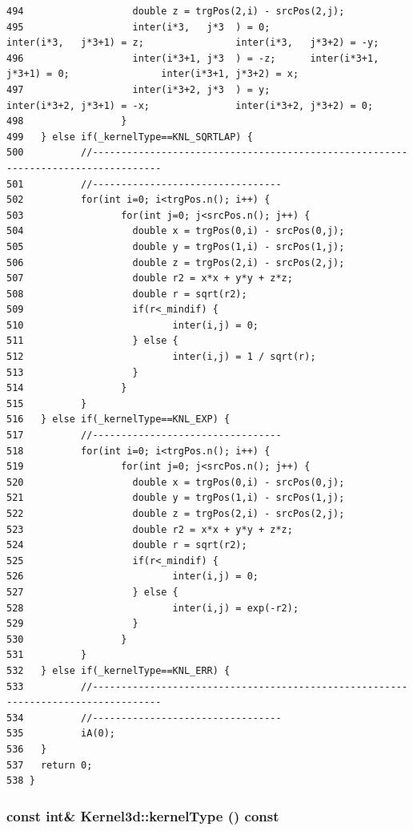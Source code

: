 \begin{verbatim}
494                   double z = trgPos(2,i) - srcPos(2,j);
495                   inter(i*3,   j*3  ) = 0;               inter(i*3,   j*3+1) = z;                inter(i*3,   j*3+2) = -y;
496                   inter(i*3+1, j*3  ) = -z;      inter(i*3+1, j*3+1) = 0;                inter(i*3+1, j*3+2) = x;
497                   inter(i*3+2, j*3  ) = y;               inter(i*3+2, j*3+1) = -x;               inter(i*3+2, j*3+2) = 0;
498                 }
499   } else if(_kernelType==KNL_SQRTLAP) {
500          //----------------------------------------------------------------------------------
501          //---------------------------------
502          for(int i=0; i<trgPos.n(); i++) {
503                 for(int j=0; j<srcPos.n(); j++) {
504                   double x = trgPos(0,i) - srcPos(0,j);
505                   double y = trgPos(1,i) - srcPos(1,j);
506                   double z = trgPos(2,i) - srcPos(2,j);
507                   double r2 = x*x + y*y + z*z;
508                   double r = sqrt(r2);
509                   if(r<_mindif) {
510                          inter(i,j) = 0;
511                   } else {
512                          inter(i,j) = 1 / sqrt(r);
513                   }
514                 }
515          }
516   } else if(_kernelType==KNL_EXP) {
517          //---------------------------------
518          for(int i=0; i<trgPos.n(); i++) {
519                 for(int j=0; j<srcPos.n(); j++) {
520                   double x = trgPos(0,i) - srcPos(0,j);
521                   double y = trgPos(1,i) - srcPos(1,j);
522                   double z = trgPos(2,i) - srcPos(2,j);
523                   double r2 = x*x + y*y + z*z;
524                   double r = sqrt(r2);
525                   if(r<_mindif) {
526                          inter(i,j) = 0;
527                   } else {
528                          inter(i,j) = exp(-r2);
529                   }
530                 }
531          }
532   } else if(_kernelType==KNL_ERR) {
533          //----------------------------------------------------------------------------------
534          //---------------------------------
535          iA(0);
536   }
537   return 0;
538 }
\end{verbatim}\normalsize 


\subsubsection{\setlength{\rightskip}{0pt plus 5cm}const int\& Kernel3d::kernel\-Type () const\hspace{0.3cm}{\tt  [inline]}}\label{classKernel3d_f6c825ae8cce01ccc734e4b4abd5d8e0_f6c825ae8cce01ccc734e4b4abd5d8e0}




